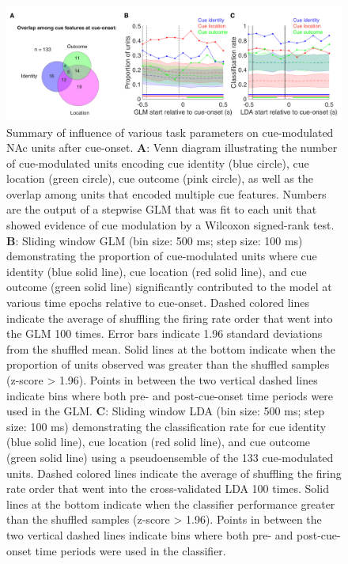 \documentclass[11pt]{article}
\newcommand{\bsf}[1]{\textbf{#1}}
\begin{document}
 \begin{figure}[ht!]
\centering
\includegraphics[width=\textwidth]{Fig 5 - Q1.pdf}
\caption{Summary of influence of various task parameters on
cue-modulated NAc units after cue-onset. \bsf{A}: Venn diagram illustrating the
number of cue-modulated units encoding cue identity (blue circle),
cue location (green circle), cue outcome (pink circle), as well as
the overlap among units that encoded multiple cue
features. Numbers are the output of a stepwise GLM that was fit to each unit that showed evidence of cue modulation by a Wilcoxon signed-rank test. \bsf{B}: Sliding window GLM (bin size: 500 ms; step size: 100 ms) demonstrating the proportion of cue-modulated units
where cue identity (blue solid line), cue location (red solid line),
and cue outcome (green solid line) significantly contributed to the
model at various time epochs relative to cue-onset. Dashed colored
lines indicate the average of shuffling the firing rate order that
went into the GLM 100 times. Error bars indicate 1.96 standard deviations from the shuffled mean. Solid lines at the bottom indicate when
the proportion of units observed was greater than the shuffled samples (z-score > 1.96). Points in between the two vertical dashed lines indicate
bins where both pre- and post-cue-onset time periods were used in
the GLM. \bsf{C}: Sliding window LDA (bin size: 500 ms; step size: 100 ms) demonstrating the classification rate for cue identity (blue solid line), cue location (red solid line), and cue outcome (green solid line) using a pseudoensemble of the 133 cue-modulated units. Dashed colored lines indicate the average of shuffling the firing rate order that went into the cross-validated LDA 100 times. Solid lines at the bottom indicate when the classifier performance greater than the shuffled samples (z-score > 1.96). Points in between the two vertical dashed lines indicate bins where both pre- and post-cue-onset time periods were used in the classifier.}
\label{fig:Q1}
\end{figure} \clearpage
\end{document}
